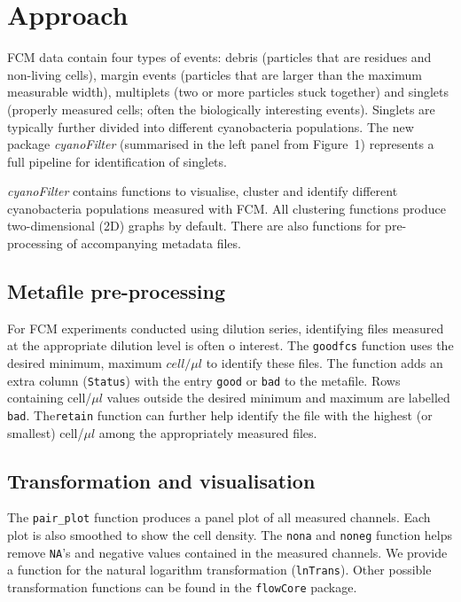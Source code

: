 \documentclass[a4paper,12pt]{extarticle}
\begin{document}
\section{Approach}
FCM data contain four types of events: debris (particles that are residues and non-living cells), margin events (particles that are larger than the maximum measurable width), multiplets (two or more particles stuck together) and singlets (properly measured cells; often the biologically interesting events). Singlets are typically further divided into different cyanobacteria populations. The new package \emph{cyanoFilter} (summarised in the left panel from Figure~1\vphantom{\ref{fig:1}}) represents a full pipeline for identification of singlets.

\emph{cyanoFilter} contains functions to visualise, cluster and identify different cyanobacteria populations measured with FCM. All clustering functions produce two-dimensional (2D) graphs by default. There are also functions for pre-processing of accompanying metadata files.

\subsection{Metafile pre-processing}
For FCM experiments conducted using dilution series, identifying files measured at the appropriate dilution level is often o interest. The \texttt{goodfcs} function uses the desired minimum, maximum $cell/\mu l$ to identify these files. The function adds an extra column (\texttt{Status}) with the entry \texttt{good} or \texttt{bad} to the metafile. Rows containing cell/$\mu l$ values outside the desired minimum and maximum are labelled \texttt{bad}. The\texttt{retain} function can further help identify the file with the highest (or smallest) cell/$\mu l$ among the appropriately measured files.

\subsection{Transformation and visualisation}
The \texttt{pair\_plot} function produces a panel plot of all measured channels. Each plot is also smoothed to show the cell density. The \texttt{nona} and \texttt{noneg} function helps remove \texttt{NA}'s and negative values contained in the measured channels. We provide a function for the natural logarithm transformation (\texttt{lnTrans}). Other possible  transformation functions can be found in the  \texttt{flowCore} package.
\end{document}
